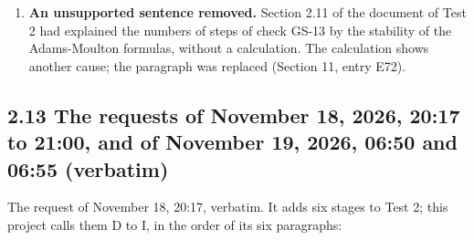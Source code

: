 \documentclass[
  10pt,
]{article}
\begin{document}
\begin{enumerate}
  same steps up to the settled ones, and settled steps whose size
  differs from that of the notebook by \(7\times10^{-14}\),
  \(3.3\times10^{-8}\) and \(3.0\times10^{-8}\) of itself; stage 22 and
  entry E89 of Section 11), every step was measured against the exact
  solution in the eigenvectors of the lattice operator, and the error of
  one step of each formula was computed from the formula as the
  integrator applies it. The result is the new Section 2.12 of the
  document of Test 2 with nineteen tables and five figures, the new
  library crate \texttt{t2steps}, the module \texttt{steps.rs} of
  \texttt{t2\_fields} with the checks GS-17 to GS-20, and the
  independent Python computation \texttt{t2\_formula\_check.py} (checks
  FC-1 to FC-6). The findings are in Section 6 of this document.
\item
  \textbf{An unsupported sentence removed.} Section 2.11 of the document
  of Test 2 had explained the numbers of steps of check GS-13 by the
  stability of the Adams-Moulton formulas, without a calculation. The
  calculation shows another cause; the paragraph was replaced (Section
  11, entry E72).
\end{enumerate}

\hypertarget{the-requests-of-november-18-2026-2017-to-2100-and-of-november-19-2026-0650-and-0655-verbatim}{%
\subsection{2.13 The requests of November 18, 2026, 20:17 to 21:00, and
of November 19, 2026, 06:50 and 06:55
(verbatim)}\label{the-requests-of-november-18-2026-2017-to-2100-and-of-november-19-2026-0650-and-0655-verbatim}}

The request of November 18, 20:17, verbatim. It adds six stages to Test
2; this project calls them D to I, in the order of its six paragraphs:
\end{document}
